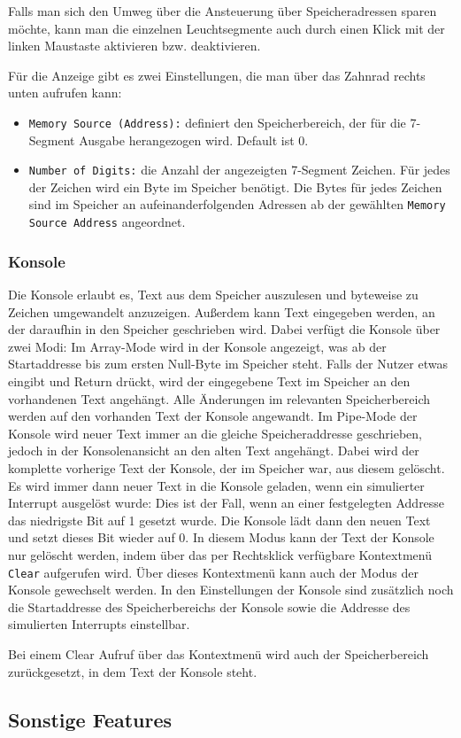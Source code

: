 Falls man sich den Umweg über die Ansteuerung über Speicheradressen sparen möchte,
kann man die einzelnen Leuchtsegmente auch durch einen Klick mit der linken Maustaste aktivieren bzw. deaktivieren.

Für die Anzeige gibt es zwei Einstellungen, die man über das Zahnrad rechts unten aufrufen kann:\\
\begin{itemize}
\item \texttt{Memory Source (Address):} definiert den Speicherbereich, der für die 7-Segment Ausgabe herangezogen wird. Default ist 0.
\item \texttt{Number of Digits:} die Anzahl der angezeigten 7-Segment Zeichen. Für jedes der Zeichen wird ein Byte im Speicher benötigt.
					Die Bytes für jedes Zeichen sind im Speicher an aufeinanderfolgenden Adressen ab der gewählten  \texttt{Memory Source Address} angeordnet.
\end{itemize}



\subsubsection{Konsole}
Die Konsole erlaubt es, Text aus dem Speicher auszulesen und byteweise zu Zeichen umgewandelt anzuzeigen. Außerdem kann Text eingegeben werden, an der daraufhin in den Speicher geschrieben wird. Dabei verfügt die Konsole über zwei Modi:
Im Array-Mode wird in der Konsole angezeigt, was ab der Startaddresse bis zum ersten Null-Byte im Speicher steht. Falls der Nutzer etwas eingibt und Return drückt, wird der eingegebene Text im Speicher an den vorhandenen Text angehängt. Alle Änderungen im relevanten Speicherbereich werden auf den vorhanden Text der Konsole angewandt.
Im Pipe-Mode der Konsole wird neuer Text immer an die gleiche Speicheraddresse geschrieben, jedoch in der Konsolenansicht an den alten Text angehängt. Dabei wird der komplette vorherige Text der Konsole, der im Speicher war, aus diesem gelöscht. Es wird immer dann neuer Text in die Konsole geladen, wenn ein simulierter Interrupt ausgelöst wurde: Dies ist der Fall, wenn an einer festgelegten Addresse das niedrigste Bit auf 1 gesetzt wurde. Die Konsole lädt dann den neuen Text und setzt dieses Bit wieder auf 0.
In diesem Modus kann der Text der Konsole nur gelöscht werden, indem über das per Rechtsklick verfügbare Kontextmenü \texttt{Clear} aufgerufen wird. Über dieses Kontextmenü kann auch der Modus der Konsole gewechselt werden.
In den Einstellungen der Konsole sind zusätzlich noch die Startaddresse des Speicherbereichs der Konsole sowie die Addresse des simulierten Interrupts einstellbar.
\begin{warningblock}
    Bei einem Clear Aufruf über das Kontextmenü wird auch der Speicherbereich zurückgesetzt, in dem Text der Konsole steht.
\end{warningblock}

\subsection{Sonstige Features}
